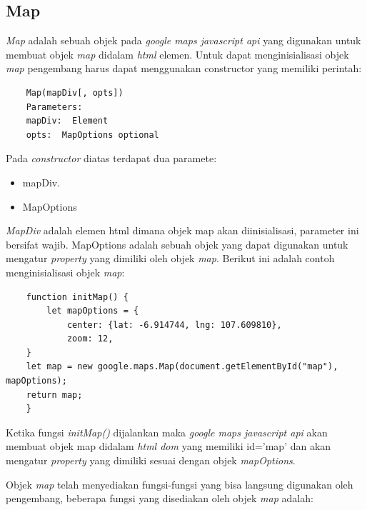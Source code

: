 \subsection{Map}
\textit{Map} adalah sebuah objek pada \textit{google maps javascript api} yang digunakan untuk membuat objek \textit{map} didalam \textit{html} elemen. Untuk dapat menginisialisasi objek \textit{map} pengembang harus dapat menggunakan constructor yang memiliki perintah:
\begin{lstlisting}
    Map(mapDiv[, opts])
    Parameters: 
    mapDiv:  Element
    opts:  MapOptions optional
\end{lstlisting}
Pada \textit{constructor} diatas terdapat dua paramete:
\begin{itemize}
    \item mapDiv.
    \item MapOptions
\end{itemize}
\textit{MapDiv} adalah elemen html dimana objek map akan diinisialisasi, parameter ini bersifat wajib. MapOptions adalah sebuah objek yang dapat digunakan untuk mengatur \textit{property} yang dimiliki oleh objek \textit{map}. Berikut ini adalah contoh menginisialisasi objek \textit{map}:
\begin{lstlisting}
    function initMap() {
        let mapOptions = {
            center: {lat: -6.914744, lng: 107.609810},
            zoom: 12,
    }
    let map = new google.maps.Map(document.getElementById("map"), mapOptions);
    return map;
    }
\end{lstlisting}
Ketika fungsi \textit{initMap()} dijalankan maka \textit{google maps javascript api} akan membuat objek map didalam \textit{html dom} yang memiliki id='map' dan akan mengatur \textit{property} yang dimiliki sesuai dengan objek \textit{mapOptions}.

Objek \textit{map} telah menyediakan fungsi-fungsi yang bisa langsung digunakan oleh pengembang, beberapa fungsi yang disediakan oleh  objek \textit{map} adalah:

